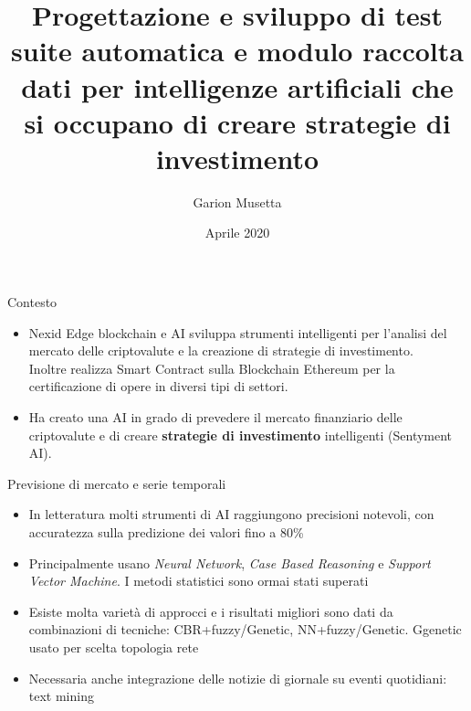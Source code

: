 \documentclass{beamer}
\title[Trading AI]{Progettazione e sviluppo di test suite automatica e modulo raccolta dati per intelligenze artificiali che si occupano di creare strategie di investimento}
\author{Garion Musetta}
\date{Aprile 2020}
\begin{document}
\maketitle

\begin{frame}{Contesto}
\begin{itemize}
\item Nexid Edge blockchain e AI sviluppa strumenti intelligenti per l’analisi del mercato delle criptovalute e
la creazione di strategie di investimento.\\ Inoltre realizza Smart Contract sulla Blockchain Ethereum per la certificazione di opere in diversi tipi di settori.
\item Ha creato una AI in grado di prevedere il mercato finanziario delle criptovalute e di creare \textbf{strategie di investimento} intelligenti (Sentyment AI).
\end{itemize}
\begin{figure}
\end{figure}
\end{frame}

\begin{frame}{Previsione di mercato e serie temporali}
\begin{itemize}
\item In letteratura molti strumenti di AI raggiungono precisioni notevoli, con accuratezza sulla predizione dei valori fino a 80\%
\item Principalmente usano \textit{Neural Network}, \textit{Case Based Reasoning} e \textit{Support Vector Machine}. I metodi statistici sono ormai stati superati
\item Esiste molta varietà di approcci e i risultati migliori sono dati da combinazioni di tecniche: CBR+fuzzy/Genetic, NN+fuzzy/Genetic. Ggenetic usato per scelta topologia rete
\item Necessaria anche integrazione delle notizie di giornale su eventi quotidiani: text mining
\end{itemize}
\end{frame}
\end{document}
